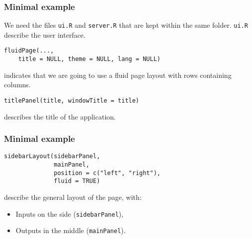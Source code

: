 \documentclass{beamer}
\begin{document}
	\begin{frame}[fragile]
		\frametitle{Minimal example}

		We need the files \verb|ui.R| and \verb|server.R| that are kept within the same folder. \verb|ui.R| describe the user interface.

		\vspace{2em}		

		\begin{exampleblock}{}
		\begin{BVerbatim}
fluidPage(...,
    title = NULL, theme = NULL, lang = NULL)
		\end{BVerbatim}
		\end{exampleblock}{}

		indicates that we are going to use a fluid page layout with rows containing columns.

		\vspace{2em}

		\begin{exampleblock}{}
		\begin{BVerbatim}
titlePanel(title, windowTitle = title)
		\end{BVerbatim}
		\end{exampleblock}{}

		describes the title of the application.

	\end{frame}

	\begin{frame}[fragile]
		\frametitle{Minimal example}
		
		\begin{exampleblock}{}
		\begin{BVerbatim}
sidebarLayout(sidebarPanel,
              mainPanel,
              position = c("left", "right"),
              fluid = TRUE)
		\end{BVerbatim}
		\end{exampleblock}{}

		\vspace{2em}

		describe the general layout of the page, with:
		\begin{itemize}
			\item Inputs on the side (\verb|sidebarPanel|),
			\item Outputs in the middle (\verb|mainPanel|).
		\end{itemize}
	
	\end{frame}
\end{document}
